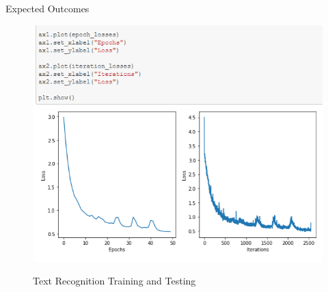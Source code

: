 \documentclass{beamer}
\begin{document}
\begin{frame}[allowframebreaks]{Expected Outcomes}
	\begin{figure}
				{\includegraphics[scale=.3]{Recognition_Result}}
				\caption{Text Recognition Training and Testing}
				\label{Recognition_Result}
	\end{figure}


\end{frame}
\end{document}
